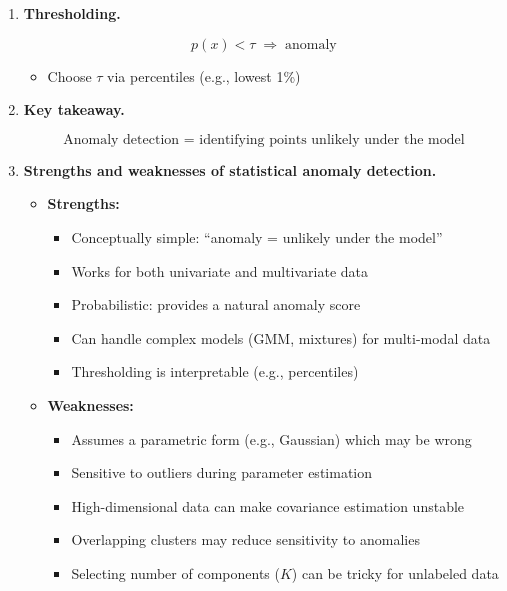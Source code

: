 \documentclass{article}
\begin{document}
\begin{enumerate}
\begin{enumerate}
    \item \textbf{Interpretation.}
    \begin{itemize}
        \item High-density regions = normal behavior
        \item Low-density regions = anomalies
        \item In GMM: anomaly if point is unlikely under \emph{all} components
    \end{itemize}
\end{enumerate}

\item \textbf{Thresholding.}

\[
p(x) < \tau \;\Rightarrow\; \text{anomaly}
\]

\begin{itemize}
    \item Choose \( \tau \) via percentiles (e.g., lowest 1\%)
\end{itemize}

\item \textbf{Key takeaway.}

\[
\text{Anomaly detection = identifying points unlikely under the model}
\]

\item \textbf{Strengths and weaknesses of statistical anomaly detection.}

\begin{itemize}
    \item \textbf{Strengths:}
    \begin{itemize}
        \item Conceptually simple: “anomaly = unlikely under the model”
        \item Works for both univariate and multivariate data
        \item Probabilistic: provides a natural anomaly score
        \item Can handle complex models (GMM, mixtures) for multi-modal data
        \item Thresholding is interpretable (e.g., percentiles)
    \end{itemize}

    \item \textbf{Weaknesses:}
    \begin{itemize}
        \item Assumes a parametric form (e.g., Gaussian) which may be wrong
        \item Sensitive to outliers during parameter estimation
        \item High-dimensional data can make covariance estimation unstable
        \item Overlapping clusters may reduce sensitivity to anomalies
        \item Selecting number of components (\(K\)) can be tricky for unlabeled data
    \end{itemize}
\end{itemize}

\end{enumerate}
\end{document}
